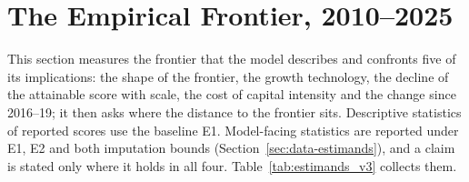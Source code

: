 \section{The Empirical Frontier, 2010--2025}\label{sec:empirics}

This section measures the frontier that the model describes and confronts five of its implications: the shape of the frontier, the growth technology, the decline of the attainable score with scale, the cost of capital intensity and the change since 2016--19; it then asks where the distance to the frontier sits. Descriptive statistics of reported scores use the baseline E1. Model-facing statistics are reported under E1, E2 and both imputation bounds (Section~\ref{sec:data-estimands}), and a claim is stated only where it holds in all four. Table~\ref{tab:estimands_v3} collects them.



